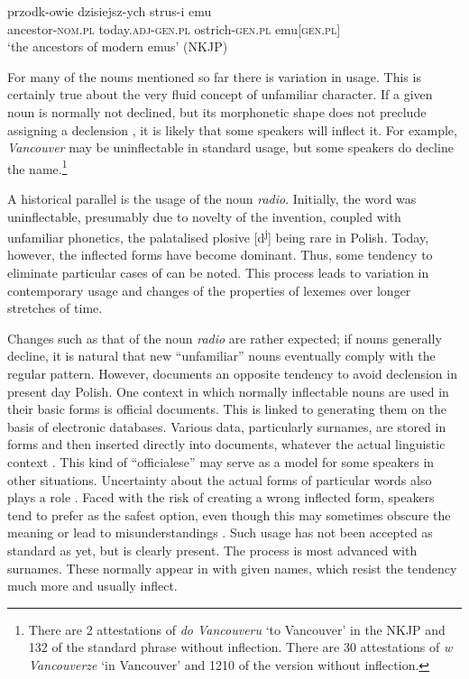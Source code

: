 \documentclass[output=paper,colorlinks,citecolor=brown]{langscibook}
\begin{document}
\begin{exe}
	\ex \label{11ex8}
	\gll przodk-owie dzisiejsz-ych strus-i emu \\
	ancestor-\textsc{nom.pl} today.\textsc{adj-gen.pl} ostrich-\textsc{gen.pl} emu[\textsc{gen.pl}] \\
	\trans ‘the ancestors of modern emus’ \hfill (NKJP)
\end{exe}

For many of the nouns mentioned so far there is variation in usage. This is certainly true about the very fluid concept of unfamiliar character. If a given noun is normally not declined, but its morphonetic shape does not preclude assigning a declension , it is likely that some speakers will inflect it. For example, \emph{Vancouver} may be uninflectable in standard usage, but some speakers do decline the name.\footnote{There are 2 attestations of \emph{do Vancouveru} `to Vancouver' in the NKJP and 132 of the standard phrase without inflection. There are 30 attestations of \emph{w Vancouverze} `in Vancouver' and 1210 of the version without inflection.}

A historical parallel is the usage of the noun \emph{radio}. Initially, the word was uninflectable, presumably due to novelty of the invention, coupled with unfamiliar phonetics, the palatalised plosive [d\textsuperscript{j}] being rare in Polish. Today, however, the inflected forms have become dominant. Thus, some tendency to eliminate particular cases of  can be noted. This process leads to variation in contemporary usage and changes of the properties of lexemes over longer stretches of time.

Changes such as that of the noun \emph{radio} are rather expected; if nouns generally decline, it is natural that new ``unfamiliar'' nouns eventually comply with the regular pattern. However, \citet{kurek2019} documents an opposite tendency to avoid declension in present day Polish. One context in which normally inflectable nouns are used in their basic forms is official documents. This is linked to generating them on the basis of electronic databases. Various data, particularly surnames, are stored in  forms and then inserted directly into documents, whatever the actual linguistic context \citep[57]{kurek2019}. This kind of ``officialese'' may serve as a model for some speakers in other situations. Uncertainty about the actual forms of particular words also plays a role \citep[61--62]{kurek2019}. Faced with the risk of creating a wrong inflected form, speakers tend to prefer  as the safest option, even though this may sometimes obscure the meaning or lead to misunderstandings \citep[157--159]{kurek2019}. Such usage has not been accepted as standard as yet, but is clearly present. The process is most advanced with surnames. These normally appear in  with given names, which resist the tendency much more and usually inflect.
\end{document}
